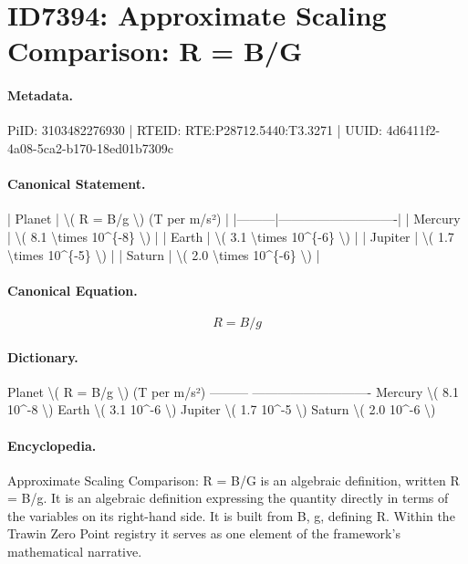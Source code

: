 \section*{ID7394: Approximate Scaling Comparison: R = B/G}
\paragraph{Metadata.}
PiID: 3103482276930 | RTEID: RTE:P28712.5440:T3.3271 | UUID: 4d6411f2-4a08-5ca2-b170-18ed01b7309c

\paragraph{Canonical Statement.}
| Planet | \textbackslash{}( R = B/g \textbackslash{}) (T per m/s²) | |---------|----------------------------| | Mercury | \textbackslash{}( 8.1 \textbackslash{}times 10\textasciicircum{}\{-8\} \textbackslash{}) | | Earth | \textbackslash{}( 3.1 \textbackslash{}times 10\textasciicircum{}\{-6\} \textbackslash{}) | | Jupiter | \textbackslash{}( 1.7 \textbackslash{}times 10\textasciicircum{}\{-5\} \textbackslash{}) | | Saturn | \textbackslash{}( 2.0 \textbackslash{}times 10\textasciicircum{}\{-6\} \textbackslash{}) |

\paragraph{Canonical Equation.}
\[
R = B/g
\]

\paragraph{Dictionary.}
Planet \textbackslash{}( R = B/g \textbackslash{}) (T per m/s²) --------- ---------------------------- Mercury \textbackslash{}( 8.1 10\textasciicircum{}-8 \textbackslash{}) Earth \textbackslash{}( 3.1 10\textasciicircum{}-6 \textbackslash{}) Jupiter \textbackslash{}( 1.7 10\textasciicircum{}-5 \textbackslash{}) Saturn \textbackslash{}( 2.0 10\textasciicircum{}-6 \textbackslash{})

\paragraph{Encyclopedia.}
Approximate Scaling Comparison: R = B/G is an algebraic definition, written R = B/g. It is an algebraic definition expressing the quantity directly in terms of the variables on its right-hand side. It is built from B, g, defining R. Within the Trawin Zero Point registry it serves as one element of the framework's mathematical narrative.
